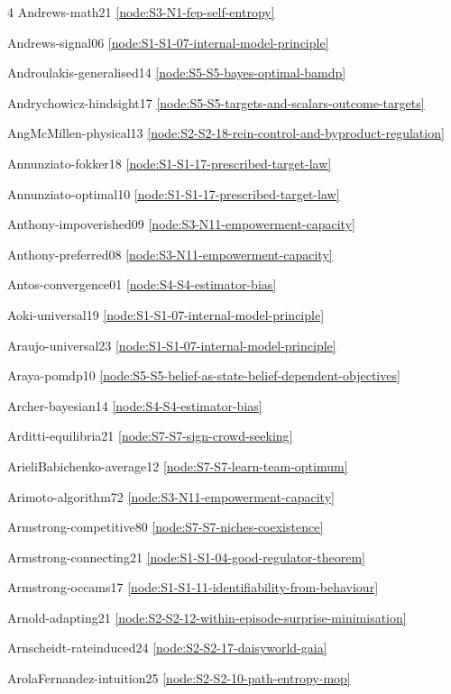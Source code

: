 \documentclass[10pt]{article}
\begin{document}
{\begin{multicols}{4}
Andrews-math21 \hfill \ref{node:S3-N1-fep-self-entropy}\par
Andrews-signal06 \hfill \ref{node:S1-S1-07-internal-model-principle}\par
Androulakis-generalised14 \hfill \ref{node:S5-S5-bayes-optimal-bamdp}\par
Andrychowicz-hindsight17 \hfill \ref{node:S5-S5-targets-and-scalars-outcome-targets}\par
AngMcMillen-physical13 \hfill \ref{node:S2-S2-18-rein-control-and-byproduct-regulation}\par
Annunziato-fokker18 \hfill \ref{node:S1-S1-17-prescribed-target-law}\par
Annunziato-optimal10 \hfill \ref{node:S1-S1-17-prescribed-target-law}\par
Anthony-impoverished09 \hfill \ref{node:S3-N11-empowerment-capacity}\par
Anthony-preferred08 \hfill \ref{node:S3-N11-empowerment-capacity}\par
Antos-convergence01 \hfill \ref{node:S4-S4-estimator-bias}\par
Aoki-universal19 \hfill \ref{node:S1-S1-07-internal-model-principle}\par
Araujo-universal23 \hfill \ref{node:S1-S1-07-internal-model-principle}\par
Araya-pomdp10 \hfill \ref{node:S5-S5-belief-as-state-belief-dependent-objectives}\par
Archer-bayesian14 \hfill \ref{node:S4-S4-estimator-bias}\par
Arditti-equilibria21 \hfill \ref{node:S7-S7-sign-crowd-seeking}\par
ArieliBabichenko-average12 \hfill \ref{node:S7-S7-learn-team-optimum}\par
Arimoto-algorithm72 \hfill \ref{node:S3-N11-empowerment-capacity}\par
Armstrong-competitive80 \hfill \ref{node:S7-S7-niches-coexistence}\par
Armstrong-connecting21 \hfill \ref{node:S1-S1-04-good-regulator-theorem}\par
Armstrong-occams17 \hfill \ref{node:S1-S1-11-identifiability-from-behaviour}\par
Arnold-adapting21 \hfill \ref{node:S2-S2-12-within-episode-surprise-minimisation}\par
Arnscheidt-rateinduced24 \hfill \ref{node:S2-S2-17-daisyworld-gaia}\par
ArolaFernandez-intuition25 \hfill \ref{node:S2-S2-10-path-entropy-mop}\par

\end{multicols}}
\end{document}
